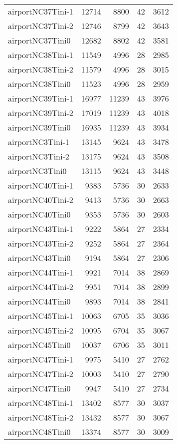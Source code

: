 \begin{longtable}{lrrrr}
airportNC37Tini-1 & 12714 & 8800 & 42 & 3612 \\
airportNC37Tini-2 & 12746 & 8799 & 42 & 3643 \\
airportNC37Tini0 & 12682 & 8802 & 42 & 3581 \\
airportNC38Tini-1 & 11549 & 4996 & 28 & 2985 \\
airportNC38Tini-2 & 11579 & 4996 & 28 & 3015 \\
airportNC38Tini0 & 11523 & 4996 & 28 & 2959 \\
airportNC39Tini-1 & 16977 & 11239 & 43 & 3976 \\
airportNC39Tini-2 & 17019 & 11239 & 43 & 4018 \\
airportNC39Tini0 & 16935 & 11239 & 43 & 3934 \\
airportNC3Tini-1 & 13145 & 9624 & 43 & 3478 \\
airportNC3Tini-2 & 13175 & 9624 & 43 & 3508 \\
airportNC3Tini0 & 13115 & 9624 & 43 & 3448 \\
airportNC40Tini-1 & 9383 & 5736 & 30 & 2633 \\
airportNC40Tini-2 & 9413 & 5736 & 30 & 2663 \\
airportNC40Tini0 & 9353 & 5736 & 30 & 2603 \\
airportNC43Tini-1 & 9222 & 5864 & 27 & 2334 \\
airportNC43Tini-2 & 9252 & 5864 & 27 & 2364 \\
airportNC43Tini0 & 9194 & 5864 & 27 & 2306 \\
airportNC44Tini-1 & 9921 & 7014 & 38 & 2869 \\
airportNC44Tini-2 & 9951 & 7014 & 38 & 2899 \\
airportNC44Tini0 & 9893 & 7014 & 38 & 2841 \\
airportNC45Tini-1 & 10063 & 6705 & 35 & 3036 \\
airportNC45Tini-2 & 10095 & 6704 & 35 & 3067 \\
airportNC45Tini0 & 10037 & 6706 & 35 & 3011 \\
airportNC47Tini-1 & 9975 & 5410 & 27 & 2762 \\
airportNC47Tini-2 & 10003 & 5410 & 27 & 2790 \\
airportNC47Tini0 & 9947 & 5410 & 27 & 2734 \\
airportNC48Tini-1 & 13402 & 8577 & 30 & 3037 \\
airportNC48Tini-2 & 13432 & 8577 & 30 & 3067 \\
airportNC48Tini0 & 13374 & 8577 & 30 & 3009 \\

\end{longtable}
